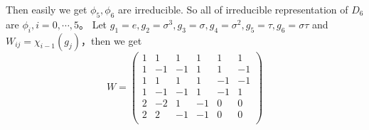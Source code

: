 \documentclass{ctexart}
\begin{document}
\begin{solution}
\begin{enumerate}
      Then easily we get \(\phi_5,\phi_6\) are irreducible. So all of irreducible representation of \(D_6\) are \(\phi_i,i=0,\cdots,5\)\nolinebreak[4]。
      Let \(g_1=e,g_2=\sigma^3,g_3=\sigma,g_4=\sigma^2,g_5=\tau,g_6=\sigma \tau\) and \(W_{ij}=\chi_{i-1}( g_j)\)\nolinebreak[4]，then we get
      \[
        W=
        \begin{pmatrix}
          1 & 1  & 1  & 1  & 1  & 1  \\
          1 & -1 & -1 & 1  & 1  & -1 \\
          1 & 1  & 1  & 1  & -1 & -1 \\
          1 & -1 & -1 & 1  & -1 & 1  \\
          2 & -2 & 1  & -1 & 0  & 0  \\
          2 & 2  & -1 & -1 & 0  & 0  \\
        \end{pmatrix}
      \]
  \end{enumerate}
\end{solution}
\end{document}
